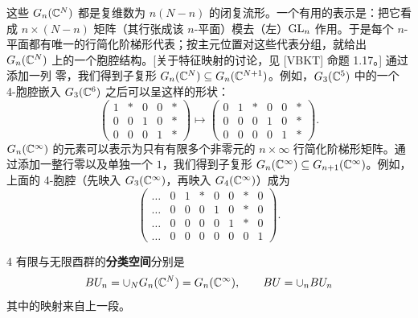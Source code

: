 这些 $G_n(\mathbb{C}^N)$ 都是复维数为 $n(N-n)$ 的闭复流形。一个有用的表示是：把它看成 $n\times(N-n)$ 矩阵（其行张成该 $n$-平面）模去（左）$\operatorname{GL}_n$ 作用。于是每个 $n$-平面都有唯一的行简化阶梯形代表；按主元位置对这些代表分组，就给出 $G_n(\mathbb{C}^N)$ 上的一个胞腔结构。[关于特征映射的讨论，见 [VBKT] 命题 1.17。] 通过添加一列
零，我们得到子复形 $G_n(\mathbb{C}^N)\subseteq G_n(\mathbb{C}^{N+1})$。例如，$G_3(\mathbb{C}^5)$ 中的一个 4-胞腔嵌入 $G_3(\mathbb{C}^6)$ 之后可以呈这样的形状：
\[
\begin{pmatrix} 1 & * & 0 & 0 & * \\ 0 & 0 & 1 & 0 & * \\ 0 & 0 & 0 & 1 & * \end{pmatrix}
\mapsto
\begin{pmatrix} 0 & 1 & * & 0 & 0 & * \\ 0 & 0 & 0 & 1 & 0 & * \\ 0 & 0 & 0 & 0 & 1 & * \end{pmatrix}.
\]
$G_n(\mathbb{C}^\infty)$ 的元素可以表示为只有有限多个非零元的 $n\times\infty$ 行简化阶梯形矩阵。通过添加一整行零以及单独一个 $1$，我们得到子复形 $G_n(\mathbb{C}^\infty)\subseteq G_{n+1}(\mathbb{C}^\infty)$。例如，上面的 4-胞腔（先映入 $G_3(\mathbb{C}^\infty)$，再映入 $G_4(\mathbb{C}^\infty)$）成为
\[
\begin{pmatrix}
\dots & 0 & 1 & * & 0 & 0 & * & 0\\
\dots & 0 & 0 & 0 & 1 & 0 & * & 0\\
\dots & 0 & 0 & 0 & 0 & 1 & * & 0\\
\dots & 0 & 0 & 0 & 0 & 0 & 0 & 1
\end{pmatrix}.
\]

\begin{defn}{4} 有限与无限酉群的\textbf{分类空间}分别是
\[
BU_n=\cup_N G_n(\mathbb{C}^N)=G_n(\mathbb{C}^\infty),\qquad BU=\cup_n BU_n
\]
其中的映射来自上一段。
\end{defn}

